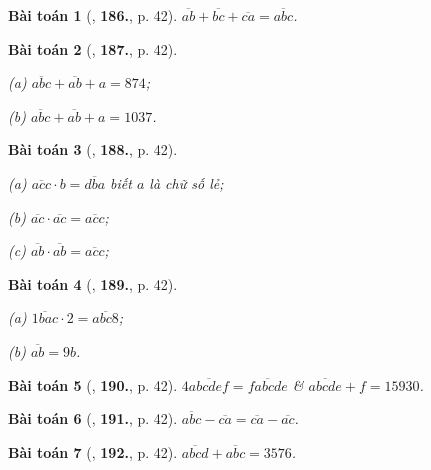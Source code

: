 \documentclass{article}
\numberwithin{equation}{section}
\newtheorem{baitoan}{Bài toán}[section]
\begin{document}
\begin{baitoan}[\cite{Binh_Toan_6_tap_1}, \textbf{186.}, p. 42]
	$\overline{ab} + \overline{bc} + \overline{ca} = \overline{abc}$.
\end{baitoan}

\begin{baitoan}[\cite{Binh_Toan_6_tap_1}, \textbf{187.}, p. 42]
	\begin{enumerate*}
		\item[(a)] $\overline{abc} + \overline{ab} + a = 874$;
		\item[(b)] $\overline{abc} + \overline{ab} + a = 1037$.
	\end{enumerate*}
\end{baitoan}

\begin{baitoan}[\cite{Binh_Toan_6_tap_1}, \textbf{188.}, p. 42]
	\begin{enumerate*}
		\item[(a)] $\overline{acc}\cdot b = \overline{dba}$ biết $a$ là chữ số lẻ;
		\item[(b)] $\overline{ac}\cdot\overline{ac} = \overline{acc}$;
		\item[(c)] $\overline{ab}\cdot\overline{ab} = \overline{acc}$;
	\end{enumerate*}
\end{baitoan}

\begin{baitoan}[\cite{Binh_Toan_6_tap_1}, \textbf{189.}, p. 42]
	\begin{enumerate*}
		\item[(a)] $\overline{1bac}\cdot 2 = \overline{abc8}$;
		\item[(b)] $\overline{ab} = 9b$.
	\end{enumerate*}
\end{baitoan}

\begin{baitoan}[\cite{Binh_Toan_6_tap_1}, \textbf{190.}, p. 42]
	$4\overline{abcdef} = \overline{fabcde}$ \& $\overline{abcde} + f = 15930$.
\end{baitoan}

\begin{baitoan}[\cite{Binh_Toan_6_tap_1}, \textbf{191.}, p. 42]
	$\overline{abc} - \overline{ca} = \overline{ca} - \overline{ac}$.
\end{baitoan}

\begin{baitoan}[\cite{Binh_Toan_6_tap_1}, \textbf{192.}, p. 42]
	$\overline{abcd} + \overline{abc} = 3576$.
\end{baitoan}
\end{document}
